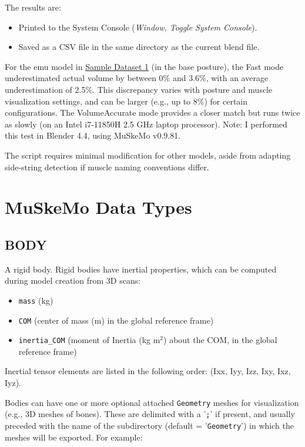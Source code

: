 \documentclass{article}
\begin{document}
The results are:
\begin{itemize}
    \item Printed to the System Console (\emph{Window, Toggle System Console}).
    \item Saved as a CSV file in the same directory as the current blend file.
\end{itemize}

For the emu model in \href{https://github.com/PashavanBijlert/MuSkeMo/releases/tag/v0.x-sampledataset1}{Sample Dataset 1} (in the base posture), the Fast mode underestimated actual volume by between 0\% and 3.6\%, with an average underestimation of 2.5\%. This discrepancy varies with posture and muscle visualization settings, and can be larger (e.g., up to 8\%) for certain configurations. The VolumeAccurate mode provides a closer match but runs twice as slowly (on an Intel i7-11850H 2.5 GHz laptop processor). Note: I performed this test in Blender 4.4, using MuSkeMo v0.9.81.

\noindent The script requires minimal modification for other models, aside from adapting side-string detection if muscle naming conventions differ.



\section{MuSkeMo Data Types}
\label{sec:DataTypes}



\subsection{BODY}
\label{sec:body}

A rigid body. Rigid bodies have inertial properties, which can be computed during model creation from 3D scans:

\begin{itemize}
    \item \texttt{mass} (kg)
    \item \texttt{COM} (center of mass (m) in the global reference frame)
    \item \texttt{inertia\_COM} (moment of Inertia (kg m\(^2\)) about the COM, in the global reference frame)
\end{itemize}

Inertial tensor elements are listed in the following order: (Ixx, Iyy, Izz, Ixy, Ixz, Iyz).

Bodies can have one or more optional attached \texttt{Geometry} meshes for visualization (e.g., 3D meshes of bones). These are delimited with a '\texttt{;}' if present, and usually preceded with the name of the subdirectory (default = '\texttt{Geometry}') in which the meshes will be exported. For example: 
\end{document}
